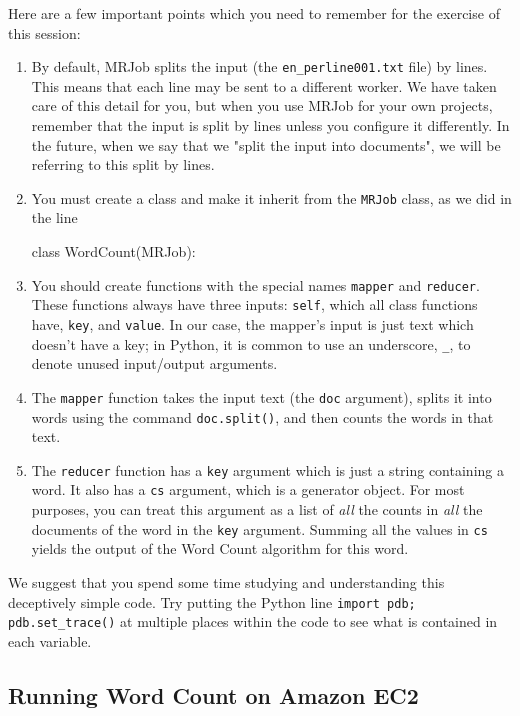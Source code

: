 Here are a few important points which you need to remember for the exercise of this session:
%
\begin{enumerate}
	\item By default, MRJob splits the input (the \texttt{en\_perline001.txt} file) by lines. This means that each line may be sent to a different worker. We have taken care of this detail for you, but when you use MRJob for your own projects, remember that the input is split by lines unless you configure it differently. In the future, when we say that we "split the input into documents", we will be referring to this split by lines.
	\item You must create a class and make it inherit from the \texttt{MRJob} class, as we did in the line 	
\begin{python}
	class WordCount(MRJob):
\end{python}
	\item You should create functions with the special names \texttt{mapper} and \texttt{reducer}. These functions always have three inputs: \texttt{self}, which all class functions have, \texttt{key}, and \texttt{value}. In our case, the mapper's input is just text which doesn't have a key; in Python, it is common to use an underscore, \texttt{\_}, to denote unused input/output arguments.
	\item The \texttt{mapper} function takes the input text (the \texttt{doc} argument), splits it into words using the command \texttt{doc.split()}, and then counts the words in that text.
	\item The \texttt{reducer} function has a \texttt{key} argument which is just a string containing a word. It also has a \texttt{cs} argument, which is a generator object. For most purposes, you can treat this argument as a list of \emph{all} the counts in \emph{all} the documents of the word in the \texttt{key} argument. Summing all the values in \texttt{cs} yields the output of the Word Count algorithm for this word.
\end{enumerate}

We suggest that you spend some time studying and understanding this deceptively simple code. Try putting the Python line \texttt{import pdb; pdb.set\_trace()} at multiple places within the code to see what is contained in each variable.

\subsection{Running Word Count on Amazon EC2}

